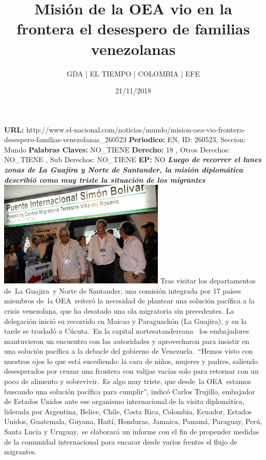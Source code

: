\documentclass{article}%
\title{\textbf{Misión de la OEA vio en la frontera el desespero de familias venezolanas}}%
\author{GDA | EL TIEMPO | COLOMBIA | EFE}%
\date{21/11/2018}%
\begin{document}
%
\normalsize%
\maketitle%
\textbf{URL: }%
http://www.el{-}nacional.com/noticias/mundo/mision{-}oea{-}vio{-}frontera{-}desespero{-}familias{-}venezolanas\_260523\newline%
%
\textbf{Periodico: }%
EN, %
ID: %
260523, %
Seccion: %
Mundo\newline%
%
\textbf{Palabras Claves: }%
NO\_TIENE\newline%
%
\textbf{Derecho: }%
18%
, Otros Derechos: %
NO\_TIENE%
, Sub Derechos: %
NO\_TIENE%
\newline%
%
\textbf{EP: }%
NO\newline%
\newline%
%
\textbf{\textit{Luego de recorrer el lunes zonas de La Guajira y Norte de Santander, la misión diplomática describió como muy triste la situación de los migrantes}}%
\newline%
\newline%
%
\includegraphics[width=300px]{160.jpg}%
\newline%
%
Tras visitar los departamentos de~La Guajira~y Norte de Santander, una comisión integrada por 17 países miembros de~la OEA~reiteró la necesidad de plantear una solución pacífica a la crisis venezolana, que ha desatado una ola migratoria sin precedentes.%
\newline%
%
La delegación inició su recorrido en Maicao y Paraguachón (La Guajira), y en la tarde se trasladó a Cúcuta.~En la capital nortesatandereana ~los embajadores mantuvieron un encuentro con las autoridades y aprovecharon para insistir en una solución pacífica a la debacle del gobierno de Venezuela.~“Hemos visto con nuestros ojos lo que está sucediendo: la cara de niños, mujeres y padres, saliendo desesperados por cruzar una frontera con valijas vacías solo para retornar con un poco de alimento y sobrevivir.~Es algo muy triste, que desde~la OEA~estamos buscando una solución pacífica para cumplir”, indicó Carlos Trujillo, embajador de Estados Unidos ante ese organismo internacional.de la visita diplomática, liderada por Argentina, Belice, Chile, Costa Rica, Colombia, Ecuador, Estados Unidos, Guatemala, Guyana, Haití, Honduras, Jamaica, Panamá, Paraguay, Perú, Santa Lucía y Uruguay,~se elaborará un informe con el fin de propender medidas de la comunidad internacional para encarar desde varios frentes el flujo de migrantes.%
\end{document}
